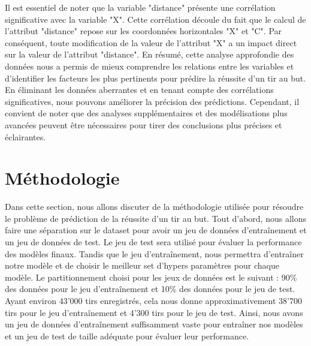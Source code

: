 \documentclass[12pt]{article}
\begin{document}
Il est essentiel de noter que la variable "distance" présente une corrélation significative avec la variable "X". 
Cette corrélation découle du fait que le calcul de l'attribut "distance" repose sur les coordonnées horizontales "X" et "C". 
Par conséquent, toute modification de la valeur de l'attribut "X" a un impact direct sur la valeur de l'attribut "distance".
\newline\newline
En résumé, cette analyse approfondie des données nous a permis de mieux comprendre les relations entre les variables et d'identifier les facteurs les plus pertinents pour prédire la réussite d'un tir au but. 
En éliminant les données aberrantes et en tenant compte des corrélations significatives, nous pouvons améliorer la précision des prédictions.
Cependant, il convient de noter que des analyses supplémentaires et des modélisations plus avancées peuvent être nécessaires pour tirer des conclusions plus précises et éclairantes.

\newpage

\section{Méthodologie}
\label{sec:methodologie}
Dans cette section, nous allons discuter de la méthodologie utilisée pour résoudre le problème de prédiction de la réussite d'un tir au but.
Tout d'abord, nous allons faire une séparation sur le dataset pour avoir un jeu de données d'entraînement et un jeu de données de test.
Le jeu de test sera utilisé pour évaluer la performance des modèles finaux. 
Tandis que le jeu d'entraînement, nous permettra d'entraîner notre modèle et de choisir le meilleur set d'hypers paramètres pour chaque modèle.
Le partitionnement choisi pour les jeux de données est le suivant : 90\% des données pour le jeu d'entraînement et 10\% des données pour le jeu de test.
Ayant environ 43'000 tirs enregistrés, cela nous donne approximativement 38'700 tirs pour le jeu d'entraînement et 4'300 tirs pour le jeu de test.
Ainsi, nous avons un jeu de données d'entraînement suffisamment vaste pour entraîner nos modèles et un jeu de test de taille adéquate pour évaluer leur performance.
\end{document}
